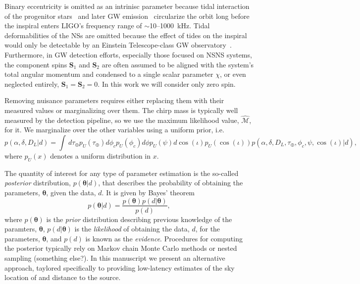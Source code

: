 \documentclass{iopart}
\begin{document}
%
Binary eccentricity is omitted as an intrinisc parameter because tidal interaction of the progenitor stars~\cite{0004-637X-572-1-407} and later \ac{GW} emission~\cite{PhysRev.136.B1224} circularize the orbit long before the inspiral enters \ac{LIGO}'s frequency range of $\sim$10\nobreakdashes--1000~kHz. Tidal deformabilities of the \acp{NS} are omitted because the effect of tides on the inspiral would only be detectable by an Einstein Telescope-class \ac{GW} observatory~\cite{PhysRevD.81.123016}. Furthermore, in \ac{GW} detection efforts, especially those focused on \ac{NSNS} systems, the component spins $\mathbf{S}_1$ and $\mathbf{S}_2$ are often assumed to be aligned with the system's total angular momentum and condensed to a single scalar parameter $\chi$, or even neglected entirely, $\mathbf{S}_1 = \mathbf{S}_2 = 0$. In this work we will consider only zero spin.

Removing nuisance parameters requires either replacing them with their measured values or marginalizing over them. The chirp mass is typically well measured by the detection pipeline, so we use the maximum likelihood value, $\hat{\mathcal{M}}$, for it. We marginalize over the other variables using a uniform prior, i.e.
\begin{equation}
p(\alpha,\delta,D_L|d) = \int\, d\tau_\oplus p_U(\tau_\oplus) d\phi_c p_U(\phi_c) d\phi p_U(\psi)  d\cos(\iota) p_U(\cos(\iota)) p(\alpha,\delta,D_L,\tau_\oplus,\phi_c,\psi,\cos(\iota)|d),
\end{equation}
where $p_U(x)$ denotes a uniform distribution in $x$.



The quantity of interest for any type of parameter estimation is the so-called {\it posterior} distribution, $p(\boldsymbol\theta|d)$, that describes the probability of obtaining the parameters, $\boldsymbol\theta$, given the data, $d$. It is given by Bayes' theorem
\begin{equation}\label{bayes}
p(\boldsymbol\theta|d) = \frac{p(\boldsymbol\theta)p(d|\boldsymbol\theta)}{p(d)},
\end{equation}
where $p(\boldsymbol\theta)$ is the {\it prior} distribution describing previous knowledge of the paramters, $\boldsymbol\theta$, $p(d|\boldsymbol\theta)$ is the {\it likelihood} of obtaining the data, $d$, for the parameters, $\boldsymbol\theta$, and $p(d)$ is known as the {\it evidence}. Procedures for computing the posterior typically rely on Markov chain Monte Carlo methods or nested sampling (something else?). In this manuscript we present an alternative approach, taylored specifically to providing low-latency estimates of the sky location of and distance to the source.
\end{document}
